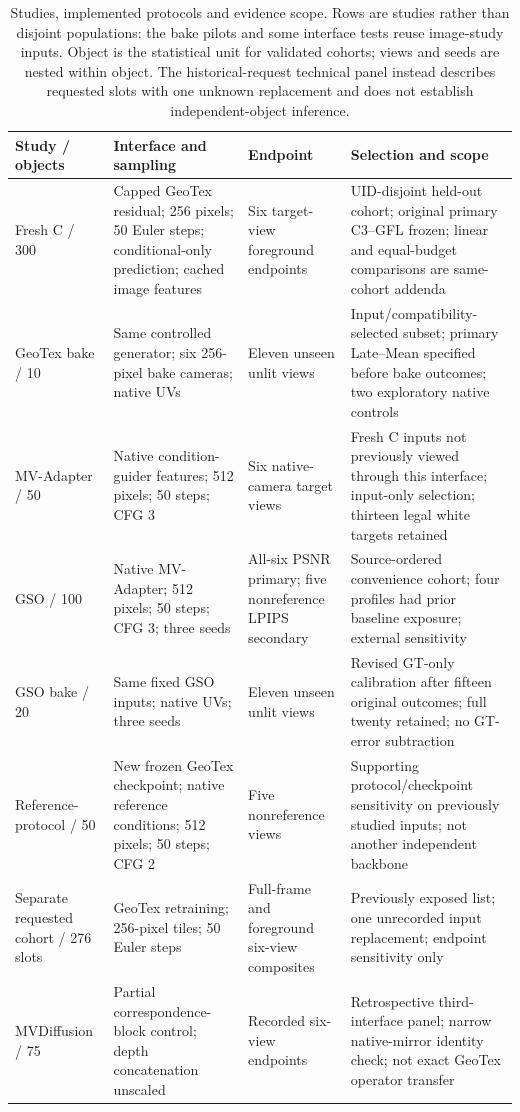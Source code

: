 \documentclass[times,twocolumn,final]{elsarticle}
\begin{document}
\begin{table}[t]
\centering\scriptsize\setlength{\tabcolsep}{3pt}
\caption{Studies, implemented protocols and evidence scope. Rows are studies rather than disjoint populations: the bake pilots and some interface tests reuse image-study inputs. Object is the statistical unit for validated cohorts; views and seeds are nested within object. The historical-request technical panel instead describes requested slots with one unknown replacement and does not establish independent-object inference.}
\label{tab:study-design}
\begin{tabular}{p{}p{}p{}p{}}
\toprule Study / objects & Interface and sampling & Endpoint & Selection and scope \\
\midrule
Fresh C / 300 & Capped GeoTex residual; 256 pixels; 50 Euler steps; conditional-only prediction; cached image features & Six target-view foreground endpoints & UID-disjoint held-out cohort; original primary C3--GFL frozen; linear and equal-budget comparisons are same-cohort addenda \\
GeoTex bake / 10 & Same controlled generator; six 256-pixel bake cameras; native UVs & Eleven unseen unlit views & Input/compatibility-selected subset; primary Late--Mean specified before bake outcomes; two exploratory native controls \\
MV-Adapter / 50 & Native condition-guider features; 512 pixels; 50 steps; CFG 3 & Six native-camera target views & Fresh C inputs not previously viewed through this interface; input-only selection; thirteen legal white targets retained \\
GSO / 100 & Native MV-Adapter; 512 pixels; 50 steps; CFG 3; three seeds & All-six PSNR primary; five nonreference LPIPS secondary & Source-ordered convenience cohort; four profiles had prior baseline exposure; external sensitivity \\
GSO bake / 20 & Same fixed GSO inputs; native UVs; three seeds & Eleven unseen unlit views & Revised GT-only calibration after fifteen original outcomes; full twenty retained; no GT-error subtraction \\
Reference-protocol / 50 & New frozen GeoTex checkpoint; native reference conditions; 512 pixels; 50 steps; CFG 2 & Five nonreference views & Supporting protocol/checkpoint sensitivity on previously studied inputs; not another independent backbone \\
Separate requested cohort / 276 slots & GeoTex retraining; 256-pixel tiles; 50 Euler steps & Full-frame and foreground six-view composites & Previously exposed list; one unrecorded input replacement; endpoint sensitivity only \\
MVDiffusion / 75 & Partial correspondence-block control; depth concatenation unscaled & Recorded six-view endpoints & Retrospective third-interface panel; narrow native-mirror identity check; not exact GeoTex operator transfer \\
\bottomrule
\end{tabular}
\end{table}
\end{document}
